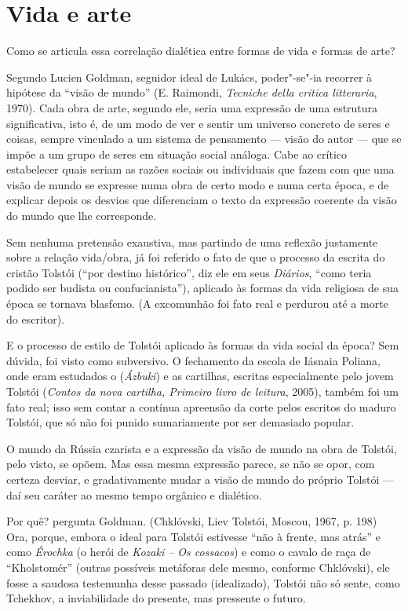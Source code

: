 \chapter{Vida e arte}

Como se articula essa correlação dialética entre formas de vida e formas
de arte?

Segundo Lucien Goldman, seguidor ideal de Lukács,
poder"-se"-ia recorrer à hipótese da ``visão de mundo'' (E. Raimondi, \emph{Tecniche della critica litteraria}, 
1970). Cada obra de arte, segundo ele, seria uma expressão de uma
estrutura significativa, isto é, de um modo de ver e sentir um universo
concreto de seres e coisas, sempre vinculado a um sistema de pensamento
--- visão do autor --- que se impõe a um grupo de seres em situação social
análoga. Cabe ao crítico estabelecer quais seriam as razões sociais ou
individuais que fazem com que uma visão de mundo se expresse numa obra
de certo modo e numa certa época, e de explicar depois os desvios que
diferenciam o texto da expressão coerente da visão do mundo que lhe
corresponde.

Sem nenhuma pretensão exaustiva, mas partindo de uma
reflexão justamente sobre a relação vida/obra, já foi referido o fato de
que o processo da escrita do cristão Tolstói (``por destino
histórico'', diz ele em seus \emph{Diários}, ``como teria podido ser budista ou
confucianista''), aplicado às formas da vida religiosa de sua época se
tornava blasfemo. (A excomunhão foi fato real e perdurou até a morte do
escritor).

E o processo de estilo de Tolstói aplicado às formas da vida
social da época? Sem dúvida, foi visto como subversivo. O fechamento da
escola de Iásnaia Poliana, onde eram estudados o  (\emph{Ázbuki}) e
as cartilhas, escritas especialmente pelo jovem Tolstói (\emph{Contos
da nova cartilha, Primeiro livro de leitura}, 2005), também foi
um fato real; isso sem contar a contínua apreensão da corte pelos
escritos do maduro Tolstói, que só não foi punido sumariamente por ser
demasiado popular.

O mundo da Rússia czarista e a expressão da visão de mundo
na obra de Tolstói, pelo visto, se opõem. Mas essa mesma expressão
parece, se não se opor, com certeza desviar, e gradativamente mudar a
visão de mundo do próprio Tolstói --- daí seu caráter ao mesmo tempo
orgânico e dialético.

Por quê? pergunta Goldman. (Chklóvski, Liev Tolstói, Moscou, 1967, p. 198) Ora,
porque, embora o ideal para Tolstói estivesse ``não à frente, mas
atrás'' e como \emph{Érochka} (o herói de \emph{Kozaki -- Os cossacos}) e
como o cavalo de raça de ``Kholstomér'' (outras possíveis metáforas dele
mesmo, conforme Chklóvski), ele fosse a saudosa testemunha desse passado
(idealizado), Tolstói não só sente, como Tchekhov, a inviabilidade do
presente, mas pressente o futuro.

